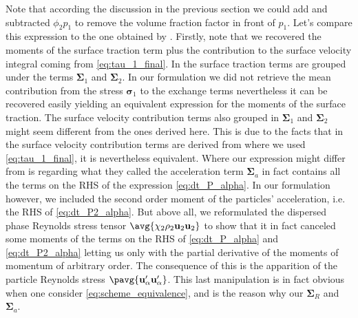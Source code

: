 Note that according the discussion in the previous section we could add and subtracted $\phi_2 p_1$ to remove the volume fraction factor in front of $p_1$.
Let's compare this expression to the one obtained by \citet{zhang1997momentum}. 
Firstly, note that we recovered the moments of the surface traction term plus the contribution to the surface velocity integral coming from \ref{eq:tau_1_final}. 
In \citet{zhang1997momentum} the surface traction terms are grouped under the terms $\bm{\Sigma}_1$ and $\bm{\Sigma}_2$.
In our formulation we did not retrieve the mean contribution from the stress $\bm{\sigma}_1$ to the exchange terms nevertheless it can be recovered easily yielding an equivalent expression for the moments of the surface traction. 
The surface velocity contribution terms also grouped in $\bm{\Sigma}_1$ and $\bm{\Sigma}_2$ might seem different from the ones derived here. 
This is due to the facts that in \citet{zhang1997momentum} the surface velocity contribution terms are derived from \citet{eq:tau_1} where we used \ref{eq:tau_1_final}, it is nevertheless equivalent. 
Where our expression might differ from \citet{zhang1997momentum} is regarding what they called the acceleration term $\bm{\Sigma}_a$ in fact contains all the terms on the RHS of the expression \ref{eq:dt_P_alpha}.
In our formulation however, we included the second order moment of the particles' acceleration, i.e. the RHS of \ref{eq:dt_P2_alpha}.
But above all, we reformulated the dispersed phase Reynolds stress tensor $\avg{\chi_2\rho_2 \textbf{u}_2 \textbf{u}_2}$ to show that it in fact canceled some moments of the terms on the RHS of \ref{eq:dt_P_alpha} and \ref{eq:dt_P2_alpha} letting us only with the partial derivative of the moments of momentum of arbitrary order.
The consequence of this is the apparition of the particle Reynolds stress $\pavg{\textbf{u}_\alpha'\textbf{u}_\alpha'}$. 
This last manipulation is in fact obvious when one consider \ref{eq:scheme_equivalence}, and is the reason why our $\bm{\Sigma}_R$ and $\bm{\Sigma}_a$.

